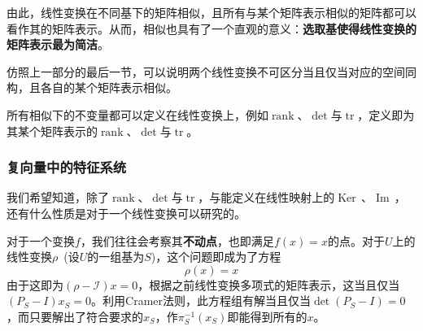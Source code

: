 \documentclass[a4paper,UTF8,fontset=windows]{ctexart}
\DeclareMathOperator{\rank}{rank}
\DeclareMathOperator{\tr}{tr}
\DeclareMathOperator{\im}{Im\,}
\DeclareMathOperator{\Ker}{Ker\,}
\newcommand*{\mi}{\mathcal{I}}
\newcommand*{\note}{\noindent *}
\begin{document}
由此，线性变换在不同基下的矩阵相似，且所有与某个矩阵表示相似的矩阵都可以看作其的矩阵表示。从而，相似也具有了一个直观的意义：\textbf{选取基使得线性变换的矩阵表示最为简洁}。

\note 仿照上一部分的最后一节，可以说明两个线性变换不可区分当且仅当对应的空间同构，且各自的某个矩阵表示相似。

\note 所有相似下的不变量都可以定义在线性变换上，例如$\rank$、$\det$与$\tr$，定义即为其某个矩阵表示的$\rank$、$\det$与$\tr$。

\subsubsection{复向量中的特征系统}
我们希望知道，除了$\rank$、$\det$与$\tr$，与能定义在线性映射上的$\Ker$、$\im$，还有什么性质是对于一个线性变换可以研究的。

对于一个变换$f$，我们往往会考察其\textbf{不动点}，也即满足$f(x)=x$的点。对于$U$上的线性变换$\rho$\ (设$U$的一组基为$S$)，这个问题即成为了方程
$$\rho(x)=x$$
由于这即为$(\rho-\mi)x=0$，根据之前线性变换多项式的矩阵表示，这当且仅当$(P_S-I)x_S=0$。利用Cramer法则，此方程组有解当且仅当$\det(P_S-I)=0$，而只要解出了符合要求的$x_S$，作$\pi_S^{-1}(x_S)$即能得到所有的$x$。
\end{document}
